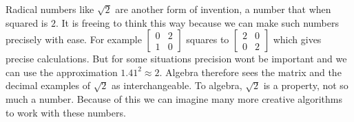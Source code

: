 Radical numbers like $\sqrt{2}$ are another form of invention, a number that when 
squared is $2$.  It is freeing to think this way because we can make such numbers 
precisely with ease.  For example $\begin{bmatrix} 0 & 2\\ 1 & 0\end{bmatrix}$
squares to $\begin{bmatrix} 2 & 0 \\ 0 & 2 \end{bmatrix}$ which gives precise 
calculations.  But for some situations precision wont be important and we can 
use the approximation $1.41^2\approx 2$.  Algebra therefore sees the matrix and the decimal 
examples of $\sqrt{2}$ as interchangeable. 
To algebra, $\sqrt{2}$ is a property, not so much a number.  Because of this 
we can imagine many more creative algorithms to work with these numbers.

